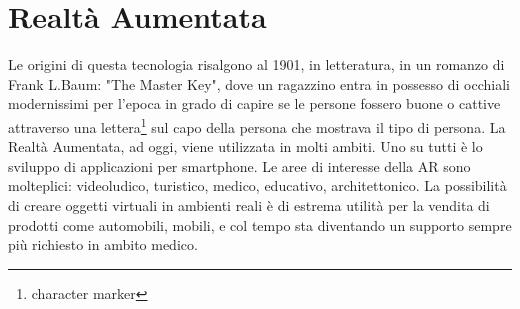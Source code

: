 {\section{Realtà Aumentata}
Le origini di questa tecnologia risalgono al 1901, in letteratura, in un romanzo di Frank L.Baum: "The Master Key", dove un ragazzino entra in possesso di occhiali modernissimi per l'epoca in grado di capire se le persone fossero buone o cattive attraverso una lettera\footnote{character marker} sul capo della persona che mostrava il tipo di persona.\cite{baum1901master}
\newline
\newline
La Realtà Aumentata, ad oggi, viene utilizzata in molti ambiti. Uno su tutti è lo sviluppo di applicazioni per smartphone.
\newline
Le aree di interesse della AR sono molteplici: videoludico, turistico, medico, educativo, architettonico.
\newline
La possibilità di creare oggetti virtuali in ambienti reali è di estrema utilità per la vendita di prodotti come automobili, mobili, e col tempo sta diventando un supporto sempre più richiesto in ambito medico. \cite{garofalo}

}
